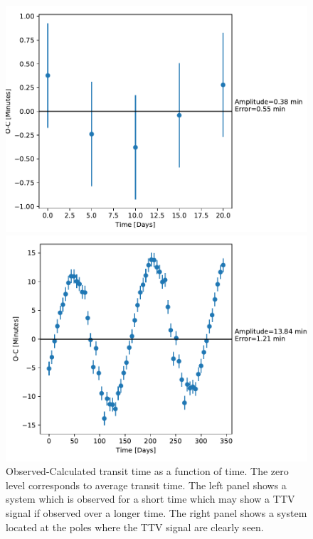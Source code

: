\documentclass[12pt]{report}
\begin{document}
\begin{figure}
\centering
\begin{minipage}{.5\textwidth}
  \centering
  \includegraphics[width=1\linewidth]{img/6_2.pdf}
 

\end{minipage}%
\begin{minipage}{.5\textwidth}
  \centering
  \includegraphics[width=1\linewidth]{img/237_0.pdf}
  

\end{minipage}
\caption{Observed-Calculated transit time as a function of time. The zero level corresponds to average transit time. The left panel shows a system which is observed for a short time which may show a TTV signal if observed over a longer time. The right panel shows a system located at the poles where the TTV signal are clearly seen.}
\label{fig:TTV1}
\end{figure}
\end{document}
